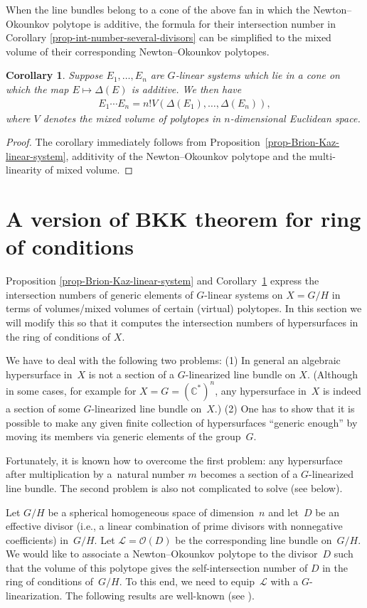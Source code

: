 \documentclass[10pt,a4paper]{amsart}
\def \C{\mathbb{C}}
\numberwithin{equation}{section}
\newtheorem{Cor}[Th]{Corollary}
\theoremstyle{definition}
\begin{document}
When the line bundles belong to a cone of the above fan in which the Newton--Okounkov polytope is additive, the formula for their intersection number in Corollary \ref{prop-int-number-several-divisors} can be simplified to the mixed volume of their corresponding Newton--Okounkov polytopes.
\begin{Cor} \label{cor-mixed-vol-Brion-Kaz}
Suppose $E_1, \ldots, E_n$ are $G$-linear systems which lie in a cone on which the map $E \mapsto \Delta(E)$ is additive. We then have
\begin{gather*} E_1 \cdots E_n = n! V(\Delta(E_1), \ldots, \Delta(E_n)),\end{gather*}
where $V$ denotes the mixed volume of polytopes in $n$-dimensional Euclidean space.
\end{Cor}
\begin{proof}The corollary immediately follows from Proposition~\ref{prop-Brion-Kaz-linear-system}, additivity of the Newton--Okounkov polytope and the multi-linearity of mixed volume.
\end{proof}

\section{A version of BKK theorem for ring of conditions}\label{sec-BKK-spherical}
Proposition \ref{prop-Brion-Kaz-linear-system} and Corollary~\ref{cor-mixed-vol-Brion-Kaz} express the intersection numbers of generic elements of $G$-linear systems on $X=G/H$ in terms of volumes/mixed volumes of certain (virtual) polytopes. In this section we will modify this so that it computes the intersection numbers of hypersurfaces in the ring of conditions of $X$.

We have to deal with the following two problems: (1) In general an algebraic hypersurface in~$X$ is not a section of a $G$-linearized line bundle on $X$. (Although in some cases, for example for $X=G=(\C^*)^n$, any hypersurface in~$X$ is indeed a section of some $G$-linearized line bundle on~$X$.) (2) One has to show that it is possible to make any given finite collection of hypersurfaces ``generic enough'' by moving its members via generic elements of the group~$G$.

Fortunately, it is known how to overcome the first problem: any hypersurface after multiplication by a~natural number $m$ becomes a section of a $G$-linearized line bundle. The second problem is also not complicated to solve (see below).

Let $G/H$ be a spherical homogeneous space of dimension~$n$ and let~$D$ be an effective divisor (i.e., a linear combination of prime divisors with nonnegative coefficients) in~$G/H$. Let ${\mathcal L} = \mathcal{O}(D)$ be the corresponding line bundle on~$G/H$. We would like to associate a Newton--Okounkov polytope to the divisor~$D$ such that the volume of this polytope gives the self-intersection number of $D$ in the ring of conditions of~$G/H$. To this end, we need to equip~${\mathcal L}$ with a $G$-linearization. The following results are well-known (see \cite{KKLV, Popov}).
\end{document}
